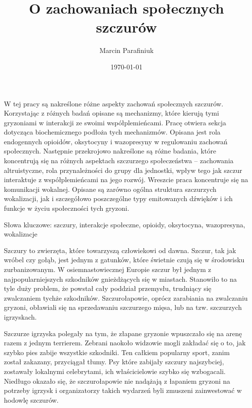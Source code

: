 \documentclass{psychol}
\title{O zachowaniach społecznych szczurów}
\author{Marcin Parafiniuk}
\date{\today}
\begin{document}
\maketitle
\tableofcontents
\doublespacing

\pagebreak


W tej pracy są nakreślone różne aspekty zachowań społecznych szczurów. Korzystając z różnych badań \colorbox{yellow!30}{opisane są} mechanizmy, które kierują tymi gryzoniami w interakcji ze swoimi współplemieńcami. \colorbox{yellow!30}{Pracę otwiera sekcja} dotycząca biochemicznego podłoża tych mechanizmów. \colorbox{yellow!30}{Opisana jest} rola endogennych opioidów, oksytocyny i wazopresyny w regulowaniu zachowań społecznych. Następnie przekrojowo \colorbox{yellow!30}{nakreślone są} różne badania, które koncentrują się na różnych aspektach szczurzego społeczeństwa -- zachowania altruistyczne, rola przynależności do grupy dla jednostki, wpływ tego jak szczur interaktuje z współplemieńcami na jego rozwój. Wreszcie \colorbox{yellow!30}{praca koncentruje się} na komunikacji wokalnej. \colorbox{yellow!30}{Opisane są} zarówno ogólna struktura szczurzych wokalizacji, jak i szczegółowo poszczególne typy emitowanych dźwięków i ich funkcje w życiu społeczności tych gryzoni.

Słowa kluczowe: szczury, interakcje społeczne, opioidy, oksytocyna, wazopresyna, wokalizacje


Szczury to zwierzęta, które towarzyszą człowiekowi od dawna. Szczur, tak jak wróbel czy gołąb, jest jednym z gatunków, które świetnie czują się w środowisku zurbanizowanym. W osiemnastowiecznej Europie szczur był jednym z najpopularniejszych szkodników gnieżdżących się w miastach. Stanowiło to na tyle duży problem, że powstał cały poddział przemysłu, trudniący się zwalczaniem tychże szkodników. Szczurołapowie, oprócz zarabiania na zwalczaniu gryzoni, obławiali się na sprzedawaniu szczurzego mięsa, lub na tzw. szczurzych igrzyskach.

Szczurze igrzyska polegały na tym, że złapane gryzonie wpuszczało się na arenę razem z jednym terrierem. Zebrani naokoło widzowie mogli zakładać się o to, jak szybko pies zabije wszystkie szkodniki. Ten całkiem popularny sport, zanim został zakazany, przyciągał tłumy. Psy które zabijały szczury najszybciej, zostawały lokalnymi celebrytami, ich właścicielowie szybko się wzbogacali. Niedługo okazało się, że szczurołapowie nie nadążają z łapaniem gryzoni na potrzeby igrzysk i organizatorzy takich wydarzeń byli zmuszeni zainwestować w hodowlę szczurów.
\end{document}
